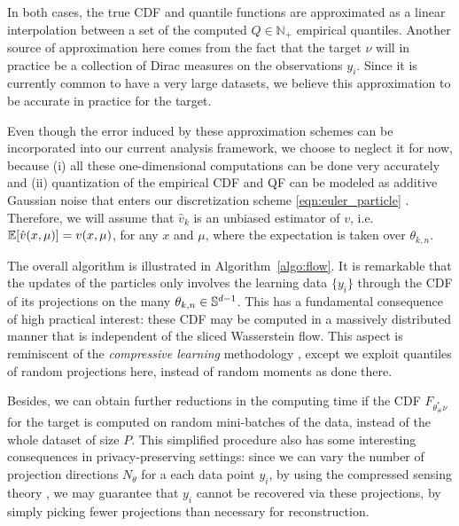 In both cases, the true CDF and quantile functions are approximated as a linear interpolation between a set of the computed $Q\in\mathbb{N}_+$ empirical quantiles.
Another source of approximation here comes from the fact that the target $\nu$ will in practice be a collection of Dirac measures on the observations $y_i$. Since it is currently common to have a very large datasets, we believe this approximation to be accurate in practice for the target.

Even though the error induced by these approximation schemes can be incorporated into our current analysis framework, we choose to neglect it for now, because (i) all these one-dimensional computations can be done very accurately and (ii) quantization of the empirical CDF and QF can be modeled as additive Gaussian noise that enters our discretization scheme \eqref{eqn:euler_particle} \cite{van1998asymptotic}. Therefore, we will assume that $\hat{v}_k$ is an unbiased estimator of $v$, i.e.\ $\mathbb{E}[\hat{v}(x,\mu)] = v(x,\mu)$, for any $x$ and $\mu$, where the expectation is taken over $\theta_{k,n}$.



The overall algorithm is illustrated in Algorithm~\ref{algo:flow}. It is remarkable that the updates of the particles only involves the learning data $\{y_i\}$ through the CDF of its projections on the many $\theta_{k,n}\in\mathbb{S}^{d-1}$. This has a fundamental consequence of high practical interest: these CDF may be computed in a massively distributed manner that is independent of the sliced Wasserstein flow. This aspect is reminiscent of the \textit{compressive learning} methodology \cite{gribonval2017compressive}, except we exploit quantiles of random projections here, instead of random moments as done there.



Besides, we can obtain further reductions in the computing time if the CDF $F_{\theta^*_\#\nu}$ for the target is computed on random mini-batches of the data, instead of the whole dataset of size $P$. This simplified procedure also has some interesting consequences in privacy-preserving settings: since we can vary the number of projection directions $N_\theta$ for a each data point $y_i$, by using the compressed sensing theory \cite{donoho2009observed}, we may guarantee that $y_i$ cannot be recovered via these projections, by simply picking fewer projections than necessary for reconstruction.




